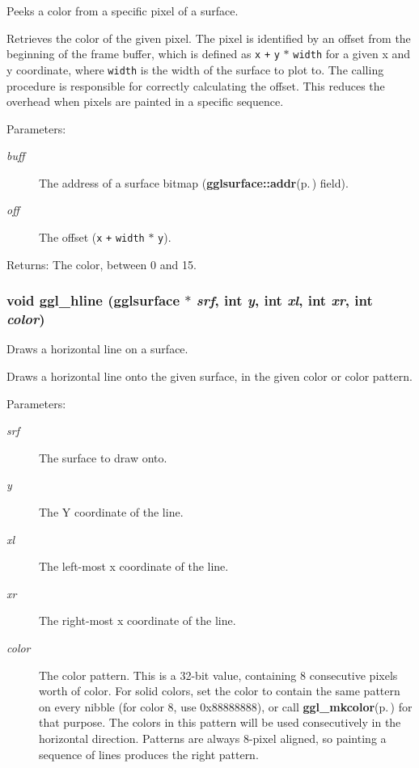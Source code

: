 Peeks a color from a specific pixel of a surface. 

Retrieves the color of the given pixel. The pixel is identified by an offset from the beginning of the frame buffer, which is defined as {\tt x} {\tt +} {\tt y} {\tt $\ast$} {\tt width} for a given x and y coordinate, where {\tt width} is the width of the surface to plot to. The calling procedure is responsible for correctly calculating the offset. This reduces the overhead when pixels are painted in a specific sequence.

\begin{Desc}
\item[Parameters:]
\begin{description}
\item[{\em buff}]The address of a surface bitmap ({\bf gglsurface::addr}{\rm (p.\,\pageref{structgglsurface_o0})} field). \item[{\em off}]The offset ({\tt x} {\tt +} {\tt width} {\tt $\ast$} {\tt y}).\end{description}
\end{Desc}
\begin{Desc}
\item[Returns:]The color, between 0 and 15. \end{Desc}
\subsubsection{\setlength{\rightskip}{0pt plus 5cm}void ggl\_\-hline ({\bf gglsurface} $\ast$ {\em srf}, int {\em y}, int {\em xl}, int {\em xr}, int {\em color})}\label{ggl_8h_a15}


Draws a horizontal line on a surface. 

Draws a horizontal line onto the given surface, in the given color or color pattern.

\begin{Desc}
\item[Parameters:]
\begin{description}
\item[{\em srf}]The surface to draw onto. \item[{\em y}]The Y coordinate of the line. \item[{\em xl}]The left-most x coordinate of the line. \item[{\em xr}]The right-most x coordinate of the line. \item[{\em color}]The color pattern. This is a 32-bit value, containing 8 consecutive pixels worth of color. For solid colors, set the color to contain the same pattern on every nibble (for color 8, use 0x88888888), or call {\bf ggl\_\-mkcolor}{\rm (p.\,\pageref{ggl_8h_a32})} for that purpose. The colors in this pattern will be used consecutively in the horizontal direction. Patterns are always 8-pixel aligned, so painting a sequence of lines produces the right pattern. \end{description}
\end{Desc}
